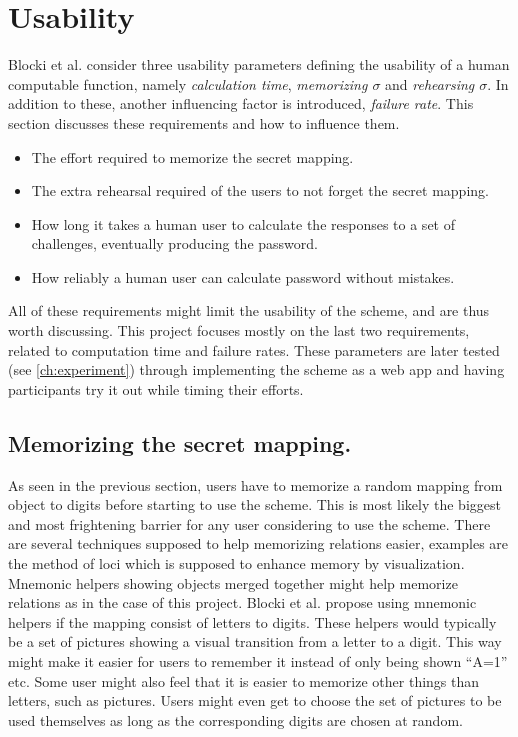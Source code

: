 \section{Usability}\label{sec:usability}
Blocki et al. \cite{hcp-blocki} consider three usability parameters defining the usability of a human computable function, namely \emph{calculation time}, \emph{memorizing $\sigma$} and \emph{rehearsing $\sigma$}. In addition to these, another influencing factor is introduced, \emph{failure rate}. This section discusses these requirements and how to influence them.
\begin{itemize}
    \item The effort required to memorize the secret mapping.
    \item The extra rehearsal required of the users to not forget the secret mapping. 
    \item How long it takes a human user to calculate the responses to a set of challenges, eventually producing the password. 
    \item How reliably a human user can calculate password without mistakes.
\end{itemize}
All of these requirements might limit the usability of the scheme, and are thus worth discussing. This project focuses mostly on the last two requirements, related to computation time and failure rates. These parameters are later tested (see \autoref{ch:experiment}) through implementing the scheme as a web app and having participants try it out while timing their efforts. 


\subsection{Memorizing the secret mapping.}
As seen in the previous section, users have to memorize a random mapping from object to digits before starting to use the scheme. This is most likely the biggest and most frightening barrier for any user considering to use the scheme. There are several techniques supposed to help memorizing relations easier, examples are the method of loci \cite{human-memory} which is supposed to enhance memory by visualization. Mnemonic helpers showing objects merged together might help memorize relations as in the case of this project. Blocki et al. \cite{hcp-blocki} propose using mnemonic helpers if the mapping consist of letters to digits. These helpers would typically be a set of pictures showing a visual transition from a letter to a digit. This way might make it easier for users to remember it instead of only being shown ``A=1'' etc. Some user might also feel that it is easier to memorize other things than letters, such as pictures. Users might even get to choose the set of pictures to be used themselves as long as the corresponding digits are chosen at random. 

